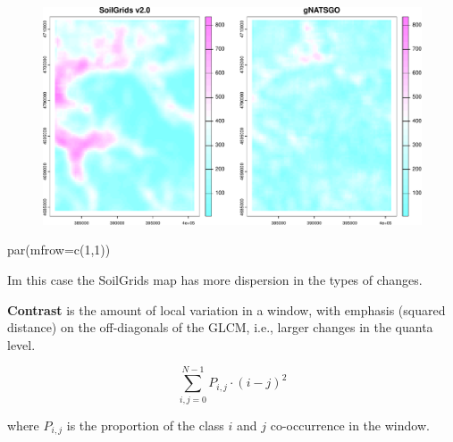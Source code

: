 \documentclass[
  letterpaper,
  DIV=11,
  numbers=noendperiod]{scrartcl}
\newenvironment{Shaded}{\begin{snugshade}}{\end{snugshade}}
\newcommand{\AttributeTok}[1]{\textcolor[rgb]{0.40,0.45,0.13}{#1}}
\newcommand{\DecValTok}[1]{\textcolor[rgb]{0.68,0.00,0.00}{#1}}
\newcommand{\FunctionTok}[1]{\textcolor[rgb]{0.28,0.35,0.67}{#1}}
\newcommand{\NormalTok}[1]{\textcolor[rgb]{0.00,0.23,0.31}{#1}}
\begin{document}
\begin{figure}[H]

{\centering \includegraphics{PatternAnalysisWorkshopTutorial_files/figure-pdf/unnamed-chunk-22-1.pdf}

}

\end{figure}

\begin{Shaded}
\begin{Highlighting}[]
\FunctionTok{par}\NormalTok{(}\AttributeTok{mfrow=}\FunctionTok{c}\NormalTok{(}\DecValTok{1}\NormalTok{,}\DecValTok{1}\NormalTok{))}
\end{Highlighting}
\end{Shaded}

Im this case the SoilGrids map has more dispersion in the types of
changes.

\textbf{Contrast} is the amount of local variation in a window, with
emphasis (squared distance) on the off-diagonals of the GLCM, i.e.,
larger changes in the quanta level.

\[\sum_{i,j = 0}^{N-1} P_{i,j}\cdot (i - j)^2\]

where \(P_{i,j}\) is the proportion of the class \(i\) and \(j\)
co-occurrence in the window.
\end{document}
